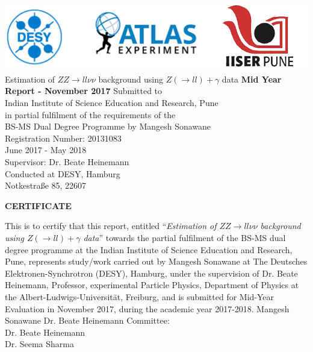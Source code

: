 \documentclass[11pt,a4paper,final]{report}
\begin{document}
\begin{titlepage}
\centering
\vfill
\vfill
\includegraphics[width = \linewidth]{Title_Head.png}
\vspace{1 in}\\
{\huge Estimation of $ZZ \rightarrow ll\nu\nu$ background using $Z(\rightarrow ll)+\gamma$ data}
\vfill
{\LARGE\textbf{Mid Year Report - November 2017}}
\vfill
{\Large Submitted to\\ Indian Institute of Science Education and Research, Pune\\in partial fulfilment of the requirements of the\\ \vspace{0.15cm}BS-MS Dual Degree Programme}
\vfill
{\Large by}
\vfill
{\Large Mangesh Sonawane\\Registration Number: 20131083\\}
\vfill
{\Large June 2017 - May 2018\\}
{\Large Supervisor: Dr. Beate Heinemann\\}
{\Large Conducted at DESY, Hamburg\\\vspace{0.15cm}Notkestra{\ss}e 85, 22607}
\vfill
\vfill
\end{titlepage}
\newpage
\vfill
\begin{center}
\textbf{\LARGE CERTIFICATE}
\end{center}
This is to certify that this report, entitled ``\textit{Estimation of $ZZ \to ll\nu\nu$ background using $Z(\to ll)+\gamma$ data}'' towards the partial fulfilment of the BS-MS dual degree programme at the Indian Institute of Science Education and Research, Pune, represents study/work carried out by Mangesh Sonawane at The Deutsches Elektronen-Synchrotron (DESY), Hamburg, under the supervision of Dr. Beate Heinemann, Professor, experimental Particle Physics, Department of Physics at the Albert-Ludwigs-Universit{\"a}t, Freiburg, and is submitted for Mid-Year Evaluation in November 2017, during the academic year 2017-2018.
\vfill
Mangesh Sonawane \hfill Dr. Beate Heinemann
\vfill
{\noindent}Committee:\\
Dr. Beate Heinemann\\
Dr. Seema Sharma
\vfill
\newpage
\tableofcontents
\newpage
\end{document}

